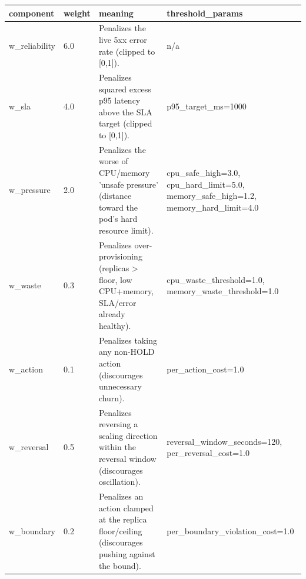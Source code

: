 \begin{tabular}{p{2cm}p{1cm}p{7.2cm}p{4.3cm}}
\hline
component & weight & meaning & threshold\_params \\
\hline
w\_reliability & 6.0 & Penalizes the live 5xx error rate (clipped to [0,1]). & n/a \\
w\_sla & 4.0 & Penalizes squared excess p95 latency above the SLA target (clipped to [0,1]). & p95\_target\_ms=1000 \\
w\_pressure & 2.0 & Penalizes the worse of CPU/memory 'unsafe pressure' (distance toward the pod's hard resource limit). & cpu\_safe\_high=3.0, cpu\_hard\_limit=5.0, memory\_safe\_high=1.2, memory\_hard\_limit=4.0 \\
w\_waste & 0.3 & Penalizes over-provisioning (replicas > floor, low CPU+memory, SLA/error already healthy). & cpu\_waste\_threshold=1.0, memory\_waste\_threshold=1.0 \\
w\_action & 0.1 & Penalizes taking any non-HOLD action (discourages unnecessary churn). & per\_action\_cost=1.0 \\
w\_reversal & 0.5 & Penalizes reversing a scaling direction within the reversal window (discourages oscillation). & reversal\_window\_seconds=120, per\_reversal\_cost=1.0 \\
w\_boundary & 0.2 & Penalizes an action clamped at the replica floor/ceiling (discourages pushing against the bound). & per\_boundary\_violation\_cost=1.0 \\
\hline
\end{tabular}
